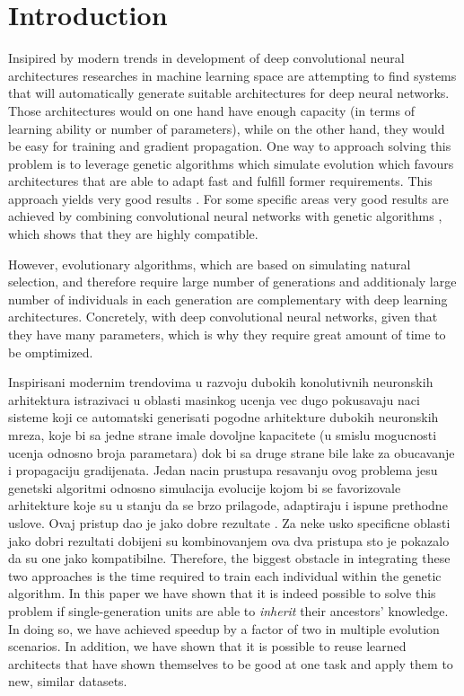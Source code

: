 \documentclass[eng]{simposium}
\begin{document}
\section{Introduction}

Insipired by modern trends in development of deep convolutional neural architectures \cite{28, 29} researches in machine 
learning space are attempting to find systems that will automatically generate suitable architectures for deep neural networks.
Those architectures would on one hand have enough capacity (in terms of learning ability or number of parameters), while on 
the other hand, they would be easy for training and gradient propagation.
One way to approach solving this problem is to leverage genetic algorithms which simulate evolution which favours architectures 
that are able to adapt fast and fulfill former requirements.
This approach yields very good results \cite{5, 30, 31}. 
For some specific areas very good results are achieved by combining convolutional neural networks with genetic algorithms \cite{32, 33},
which shows that they are highly compatible. 

However, evolutionary algorithms, which are based on simulating natural selection, and therefore require large number 
of generations and additionaly large number of individuals in each generation are complementary with deep learning architectures.
Concretely, with deep convolutional neural networks, given that they have many parameters, which is why they require great 
amount of time to be omptimized.   

Inspirisani modernim trendovima u razvoju dubokih konolutivnih neuronskih arhitektura \cite{28}\cite{29} istrazivaci u 
oblasti masinkog ucenja vec dugo pokusavaju naci sisteme koji ce automatski generisati pogodne arhitekture dubokih 
neuronskih mreza, koje bi sa jedne strane imale dovoljne kapacitete (u smislu mogucnosti ucenja odnosno broja parametara) dok 
bi sa druge strane bile lake za obucavanje i propagaciju gradijenata. Jedan nacin prustupa resavanju ovog problema jesu genetski 
algoritmi odnosno simulacija evolucije kojom bi se favorizovale arhitekture koje su u stanju da se brzo prilagode, adaptiraju 
i ispune prethodne uslove. Ovaj pristup dao je jako dobre rezultate \cite{5}\cite{30}\cite{31}. Za neke usko specificne oblasti 
jako dobri rezultati dobijeni su kombinovanjem ova dva pristupa \cite{32}\cite{33} sto je pokazalo da su one jako kompatibilne. 
Therefore, the biggest obstacle in integrating these two approaches is the time required
to train each individual within the genetic algorithm. In this paper we have shown that it is indeed possible to solve this problem if
single-generation units are able to \textit{inherit} their ancestors' knowledge.
In doing so, we have achieved speedup by a factor of two in multiple evolution scenarios.
In addition, we have shown that it is possible to reuse learned architects that have shown themselves to be good at one task
and apply them to new, similar datasets.
\end{document}
